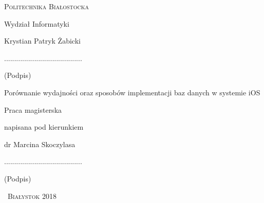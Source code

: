 \begin{titlepage}
	
	\begin{center}
		{\scshape 
			{\large Politechnika Białostocka}\par
			\vspace{0.5cm}
			{\large Wydział Informatyki}\par
			\vfill
			{\large Krystian Patryk Żabicki}\par
			\vspace{0.4cm}
			.......................................\\
			\begin{small}
				\vspace{-0.2cm}
				(Podpis)  
			\end{small}\par	
			\vspace{2cm}
			{\LARGE
				Porównanie wydajności oraz sposobów implementacji baz danych w systemie iOS
				\par
			}
			\vspace{4cm}
		}
		\begin{flushright}
			{\large
				Praca magisterska\par
				napisana pod kierunkiem\par
				dr Marcina Skoczylasa\par
				\vspace{0.4cm}
				.......................................\\
				\begin{small}
					\vspace{-0.2cm}
					(Podpis)\hspace{1.63cm}    
				\end{small}				   
			}
		\end{flushright}
		\vfill
		{\scshape\large\ Białystok 2018}
	\end{center}
	
	
\end{titlepage}
